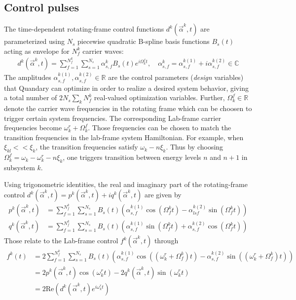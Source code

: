 \documentclass[11pt]{article}
\newcommand{\R}{\mathds{R}}
\newcommand{\C}{\mathds{C}}
\begin{document}
\subsection{Control pulses} \label{subsec:controlpulses}
The time-dependent rotating-frame control functions $d^k(\vec{\alpha}^k,t)$ are parameterized using $N_s$ piecewise quadratic B-spline basis functions $B_s(t)$ acting as envelope for $N_f^k$ carrier waves:
\begin{align}
  d^k(\vec{\alpha}^k,t) = \sum_{f=1}^{N_f^k} \sum_{s=1}^{N_s} \alpha_{s,f}^k B_s(t) e^{i\Omega_k^ft}, \quad \alpha_{s,f}^k = \alpha_{s,f}^{k(1)} + i \alpha_{s,f}^{k(2)} \in \C
\end{align}
The amplitudes $\alpha_{s,f}^{k(1)}, \alpha_{s,f}^{k(2)} \in \R$ are the control
parameters (\textit{design} variables) that Quandary can optimize in order to realize a
desired system behavior, giving a total number of $2N_s\sum_kN_f^k$ real-valued optimization variables. Further, $\Omega_k^f \in \R$ denote the carrier wave frequencies in the rotating frame which can be choosen to trigger certain system frequencies. The corresponding Lab-frame carrier frequencies become $\omega_k^r + \Omega_k^f$. Those frequencies can be chosen to match the transition frequencies in the lab-frame system Hamiltonian. For example, when $\xi_{kl} << \xi_k$, the transition frequencies satisfy $\omega_k - n\xi_k$. Thus by choosing $\Omega_k^f = \omega_k-\omega_k^r - n \xi_k$, one triggers transition between energy levels $n$ and $n+1$ in subsystem $k$. 

Using trigonometric identities, the real and imaginary part of the rotating-frame control $d^k(\vec{\alpha}^k,t) = p^k(\vec{\alpha}^k,t) + iq^k(\vec{\alpha}^k,t)$ are given by
\begin{align}
  p^k(\vec{\alpha}^k,t) &= \sum_{f=1}^{N_f^k} \sum_{s=1}^{N_s} B_s(t)
  \left(\alpha^{k
  (1)}_{s,f} \cos(\Omega_f^k t) - \alpha^{k (2)}_{lsf} \sin(\Omega_f^k t)
  \right) \\
  q^k(\vec{\alpha}^k,t) &= \sum_{f=1}^{N_f^k} \sum_{s=1}^{N_s} B_s(t)\left( \alpha^{k
  (1)}_{s,f} \sin(\Omega_f^k t) + \alpha^{k (2)}_{s,f} \cos(\Omega_f^k t)
  \right)
\end{align}
Those relate to the Lab-frame control $f^k(\vec{\alpha}^k,t)$ through
\begin{align}
  f^k(t) &=  2\sum_{f=1}^{N_f^k} \sum_{s=1}^{N_s} B_s(t) \left(\alpha_{s,f}^{k(1)} \cos((\omega_k^{r} + \Omega_f^k) t) - \alpha_{s,f}^{k(2)}\sin((\omega_k^{r} + \Omega_f^k) t) \right) \\
         &= 2 p^k(\vec{\alpha}^k, t) \cos(\omega_k^{r} t) - 2 q^k(\vec{\alpha}^k,
         t)\sin(\omega_k^{r} t) \\
         &= 2\mbox{Re}\left( d^k(\vec{\alpha}^k,t)e^{i\omega_k^r t} \right)
\end{align}
\end{document}
